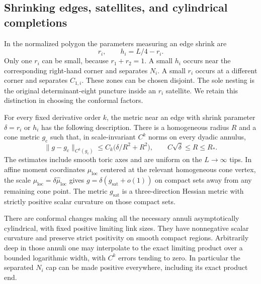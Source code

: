 \subsection{Shrinking edges, satellites, and cylindrical completions}

In the normalized polygon the parameters measuring an edge shrink
are
\begin{equation}
 r_i,\qquad h_i=L/4-r_i.
 \label{eq:geometry:shrink-parameters}
\end{equation}
Only one $r_i$ can be small, because $r_1+r_2=1$.  A small $h_i$
occurs near the corresponding right-hand corner and separates
$N_i$.  A small $r_i$ occurs at a different corner and separates
$C_{1,i}$.  These zones can be chosen disjoint.  The sole nesting
is the original determinant-eight puncture inside an $r_i$
satellite.  We retain this distinction in choosing the conformal
factors.

\begin{lemma}
\label{lem:geometry:collars}
For every fixed derivative order $k$, the metric near an edge with
shrink parameter $\delta=r_i$ or $h_i$ has the following description.
There is a homogeneous radius $R$ and a cone metric $g_{\mathrm c}$
such that, in scale-invariant $C^k$ norms on every dyadic annulus,
\begin{equation}
 \|g-g_{\mathrm c}\|_{C^k(g_{\mathrm c})}
 \le C_k\bigl(\delta/R^2+R^2\bigr),
 \qquad C\sqrt\delta\le R\le R_*.
 \label{eq:geometry:cone-error}
\end{equation}
The estimates include smooth toric axes and are uniform on the
$L\to\infty$ tips.  In affine moment coordinates $\mu_{\mathrm{loc}}$
centered at the relevant homogeneous cone vertex, the scale
$\mu_{\mathrm{loc}}=\delta\widehat\mu_{\mathrm{loc}}$ gives
$g=\delta(g_{\mathrm{sat}}+o(1))$ on compact sets away from any
remaining cone point.  The metric $g_{\mathrm{sat}}$ is a
three-direction Hessian metric with strictly positive scalar
curvature on those compact sets.

There are conformal changes making all the necessary annuli
asymptotically cylindrical, with fixed positive limiting link
sizes.  They have nonnegative scalar curvature and preserve
strict positivity on smooth compact regions.  Arbitrarily deep
in those annuli one may interpolate to the exact limiting product
over a bounded logarithmic width, with $C^k$ errors tending to
zero.  In particular the separated $N_i$ cap can be made positive
everywhere, including its exact product end.
\end{lemma}

